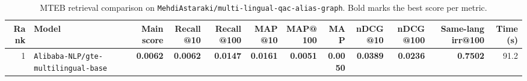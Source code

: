 \begin{table}[t]
\centering
\small
\begin{tabular}{r l r r r r r r r r r r}
\hline
Rank & Model & Main score & Recall@10 & Recall@100 & MAP@10 & MAP@100 & MAP & nDCG@10 & nDCG@100 & Same-lang irr@100 & Time (s) \\
\hline
1 & \texttt{Alibaba-NLP/gte-multilingual-base} & \textbf{0.0062} & \textbf{0.0062} & \textbf{0.0147} & \textbf{0.0161} & \textbf{0.0051} & \textbf{0.0050} & \textbf{0.0389} & \textbf{0.0236} & \textbf{0.7502} & 91.2 \\
\hline
\end{tabular}
\caption{MTEB retrieval comparison on \texttt{MehdiAstaraki/multi-lingual-qac-alias-graph}. Bold marks the best score per metric.}
\label{tab:mteb-model-comparison}
\end{table}
